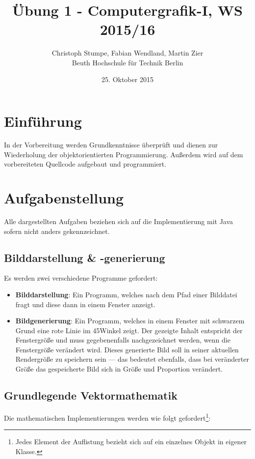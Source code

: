 \documentclass[tog]{acmsiggraph}
\title{Übung 1 - Computergrafik-I, WS 2015/16}
\author{Christoph Stumpe, Fabian Wendland, Martin Zier\\Beuth Hochschule für Technik Berlin}
\date{25. Oktober 2015}
\begin{document}
\maketitle

\tableofcontents
\newpage

\section{Einführung}

In der Vorbereitung werden Grundkenntnisse überprüft und dienen zur Wiederholung der objektorientierten Programmierung. Außerdem wird auf dem vorbereiteten Quellcode aufgebaut und programmiert.

\section{Aufgabenstellung}

Alle dargestellten Aufgaben beziehen sich auf die Implementierung mit Java sofern nicht anders gekennzeichnet.

\subsection{Bilddarstellung \& -generierung}

Es werden zwei verschiedene Programme gefordert:

\begin{itemize}
\item \textbf{Bilddarstellung}: Ein Programm, welches nach dem Pfad einer Bilddatei fragt und diese dann in einem Fenster anzeigt.
\item \textbf{Bildgenerierung}: Ein Programm, welches in einem Fenster mit schwarzem Grund eine rote Linie im 45\degree Winkel zeigt. Der gezeigte Inhalt entspricht der Fenstergröße und muss gegebenenfalls nachgezeichnet werden, wenn die Fenstergröße verändert wird. Dieses generierte Bild soll in seiner aktuellen Rendergröße zu speichern sein --- das bedeutet ebenfalls, dass bei veränderter Größe das gespeicherte Bild sich in Größe und Proportion verändert.
\end{itemize}

\subsection{Grundlegende Vektormathematik}
\label{mathTemplate}
Die mathematischen Implementierungen werden wie folgt gefordert\footnote{Jedes Element
der Auflistung bezieht sich auf ein einzelnes Objekt in eigener Klasse.}:
\end{document}
